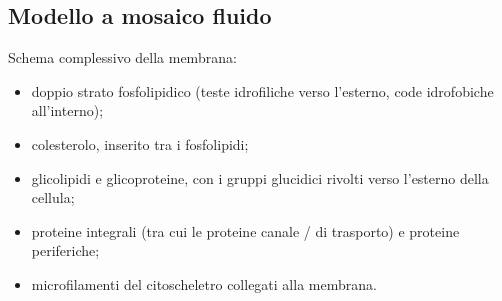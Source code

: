 \subsection{Modello a mosaico fluido}

Schema complessivo della membrana:
\begin{itemize}
  \item doppio strato fosfolipidico (teste idrofiliche verso l'esterno, code idrofobiche all'interno);
  \item colesterolo, inserito tra i fosfolipidi;
  \item glicolipidi e glicoproteine, con i gruppi glucidici rivolti verso l'esterno della cellula;
  \item proteine integrali (tra cui le proteine canale / di trasporto) e proteine periferiche;
  \item microfilamenti del citoscheletro collegati alla membrana.
\end{itemize}
